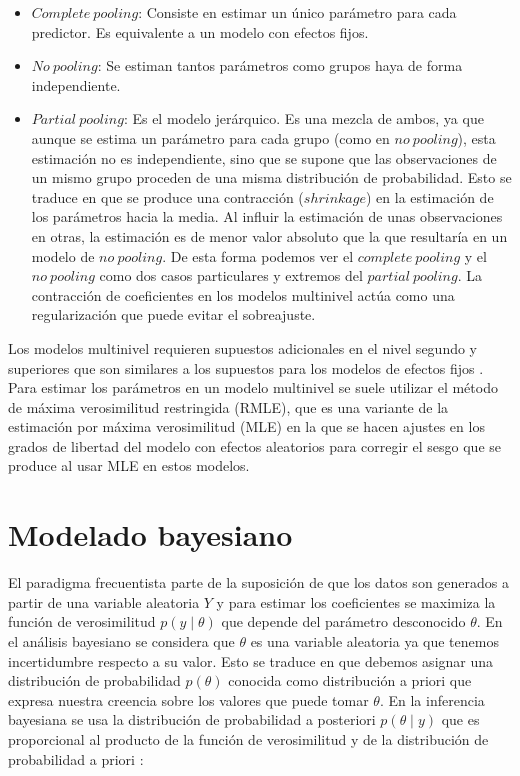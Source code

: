 \documentclass[
  12pt,
  a4paper,
  extrafontsizes,
  onecolumn,
  openright,
  table]{memoir}
\providecommand{\tightlist}{%
  \setlength{\itemsep}{0pt}\setlength{\parskip}{0pt}}\usepackage{longtable,booktabs,array}
\begin{document}
\begin{itemize}
\tightlist
\item
  \(Complete\ pooling\): Consiste en estimar un único parámetro para
  cada predictor. Es equivalente a un modelo con efectos fijos.
\item
  \(No\ pooling\): Se estiman tantos parámetros como grupos haya de
  forma independiente.
\item
  \(Partial\ pooling\): Es el modelo jerárquico. Es una mezcla de ambos,
  ya que aunque se estima un parámetro para cada grupo (como en
  \(no\ pooling\)), esta estimación no es independiente, sino que se
  supone que las observaciones de un mismo grupo proceden de una misma
  distribución de probabilidad. Esto se traduce en que se produce una
  contracción (\(shrinkage\)) en la estimación de los parámetros hacia
  la media. Al influir la estimación de unas observaciones en otras, la
  estimación es de menor valor absoluto que la que resultaría en un
  modelo de \(no\ pooling\). De esta forma podemos ver el
  \(complete\ pooling\) y el \(no\ pooling\) como dos casos particulares
  y extremos del \(partial\ pooling\). La contracción de coeficientes en
  los modelos multinivel actúa como una regularización que puede evitar
  el sobreajuste.
\end{itemize}

Los modelos multinivel requieren supuestos adicionales en el nivel
segundo y superiores que son similares a los supuestos para los modelos
de efectos fijos \autocite[ver][pp.~43]{chen2021}. Para estimar los
parámetros en un modelo multinivel se suele utilizar el método de máxima
verosimilitud restringida (RMLE), que es una variante de la estimación
por máxima verosimilitud (MLE) en la que se hacen ajustes en los grados
de libertad del modelo con efectos aleatorios para corregir el sesgo que
se produce al usar MLE en estos modelos.

\hypertarget{sec-bayesiano}{%
\section{Modelado bayesiano}\label{sec-bayesiano}}

El paradigma frecuentista parte de la suposición de que los datos son
generados a partir de una variable aleatoria \(Y\) y para estimar los
coeficientes se maximiza la función de verosimilitud
\(p(y \mid \theta)\) que depende del parámetro desconocido \(\theta\).
En el análisis bayesiano se considera que \(\theta\) es una variable
aleatoria ya que tenemos incertidumbre respecto a su valor. Esto se
traduce en que debemos asignar una distribución de probabilidad
\(p(\theta)\) conocida como distribución a priori que expresa nuestra
creencia sobre los valores que puede tomar \(\theta\). En la inferencia
bayesiana se usa la distribución de probabilidad a posteriori
\(p(\theta \mid y)\) que es proporcional al producto de la función de
verosimilitud y de la distribución de probabilidad a priori
\autocite[ver][]{nicenboim2023}:
\end{document}
